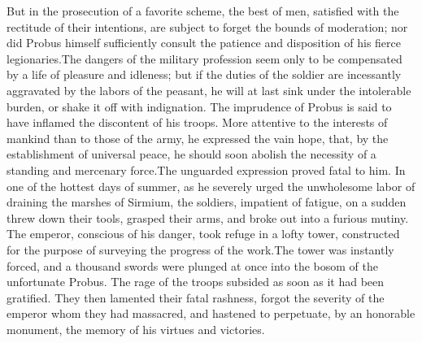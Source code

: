But in the prosecution of a favorite scheme, the best of men,
satisfied with the rectitude of their intentions, are subject to
forget the bounds of moderation; nor did Probus himself
sufficiently consult the patience and disposition of his fierce
legionaries.\footnotemark[60] The dangers of the military profession seem only
to be compensated by a life of pleasure and idleness; but if the
duties of the soldier are incessantly aggravated by the labors of
the peasant, he will at last sink under the intolerable burden,
or shake it off with indignation. The imprudence of Probus is
said to have inflamed the discontent of his troops. More
attentive to the interests of mankind than to those of the army,
he expressed the vain hope, that, by the establishment of
universal peace, he should soon abolish the necessity of a
standing and mercenary force.\footnotemark[61] The unguarded expression proved
fatal to him. In one of the hottest days of summer, as he
severely urged the unwholesome labor of draining the marshes of
Sirmium, the soldiers, impatient of fatigue, on a sudden threw
down their tools, grasped their arms, and broke out into a
furious mutiny. The emperor, conscious of his danger, took refuge
in a lofty tower, constructed for the purpose of surveying the
progress of the work.\footnotemark[62] The tower was instantly forced, and a
thousand swords were plunged at once into the bosom of the
unfortunate Probus. The rage of the troops subsided as soon as it
had been gratified. They then lamented their fatal rashness,
forgot the severity of the emperor whom they had massacred, and
hastened to perpetuate, by an honorable monument, the memory of
his virtues and victories.\footnotemark[63]





